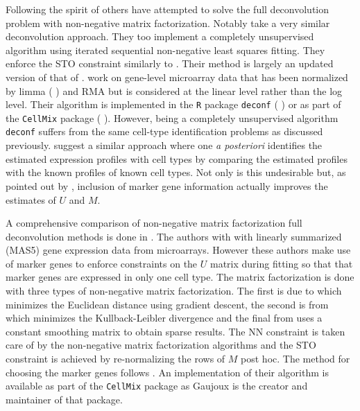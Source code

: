 \documentclass[reqno,12pt,oneside]{report}\usepackage[]{graphicx}\usepackage[]{color}
\renewcommand{\citet}[1]{(\citeauthor{#1} \citeyear{#1})}
\theoremstyle{plain}
\theoremstyle{definition}
\theoremstyle{remark}
\numberwithin{theorem}{chapter}     %
\begin{document}
Following the spirit of \citeauthor{Venet2001} others have attempted to solve the full deconvolution problem with non-negative matrix factorization. Notably \cite{Repsilber2010} take a very similar deconvolution approach. They too implement a completely unsupervised algorithm using iterated sequential non-negative least squares fitting. They enforce the STO constraint similarly to \citeauthor{Venet2001}. Their method is largely an updated version of that of \citeauthor{Venet2001}. \citeauthor{Repsilber2010} work on gene-level microarray data that has been normalized by limma \citet{Ritchie2015} and RMA  but is considered at the linear level rather than the log level. Their algorithm is implemented in the \verb+R+ package \verb+deconf+ \citet{Repsilber2010} or as part of the \verb+CellMix+ package \citet{Gaujoux2013}. However, being a completely unsupervised algorithm \verb+deconf+ suffers from the same cell-type identification problems as discussed previously. \citeauthor{Repsilber2010} suggest a similar approach where one \emph{a posteriori} identifies the estimated expression profiles with cell types by comparing the estimated profiles with the known profiles of known cell types. Not only is this undesirable but, as pointed out by \cite{Gaujoux2012}, inclusion of marker gene information actually improves the estimates of $U$ and $M$.

A comprehensive comparison of non-negative matrix factorization full deconvolution methods is done in \cite{Gaujoux2012}. The authors with with linearly summarized (MAS5) gene expression data from microarrays. However these authors make use of marker genes to enforce constraints on the $U$ matrix during fitting so that that marker genes are expressed in only one cell type. The matrix factorization is done with three types of non-negative matrix factorization. The first is due to \cite{lee2000} which minimizes the Euclidean distance using gradient descent, the second is from \cite{Brunet2004} which minimizes the Kullback-Leibler divergence and the final from \cite{Pascual-montano2006} uses a constant smoothing matrix to obtain sparse results. The NN constraint is taken care of by the non-negative matrix factorization algorithms and the STO constraint is achieved by re-normalizing the rows of $M$ post hoc. The method for choosing the marker genes follows \cite{Abbas2009}. An implementation of their algorithm is available as part of the \verb+CellMix+ package as Gaujoux is the creator and maintainer of that package.
\end{document}
